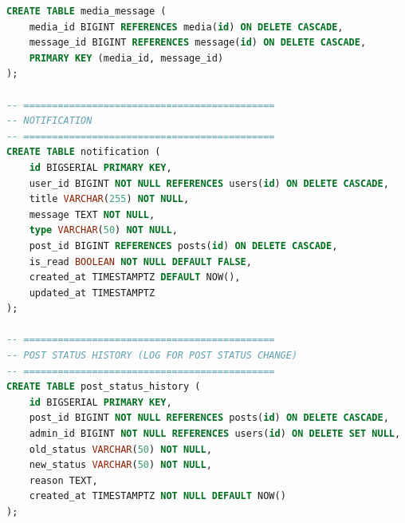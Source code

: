 \begin{lstlisting}[language=sql]
CREATE TABLE media_message (
    media_id BIGINT REFERENCES media(id) ON DELETE CASCADE,
    message_id BIGINT REFERENCES message(id) ON DELETE CASCADE,
    PRIMARY KEY (media_id, message_id)
);

-- ============================================
-- NOTIFICATION
-- ============================================
CREATE TABLE notification (
    id BIGSERIAL PRIMARY KEY,
    user_id BIGINT NOT NULL REFERENCES users(id) ON DELETE CASCADE,
    title VARCHAR(255) NOT NULL,
    message TEXT NOT NULL,
    type VARCHAR(50) NOT NULL,
    post_id BIGINT REFERENCES posts(id) ON DELETE CASCADE,
    is_read BOOLEAN NOT NULL DEFAULT FALSE,
    created_at TIMESTAMPTZ DEFAULT NOW(),
    updated_at TIMESTAMPTZ
);

-- ============================================
-- POST STATUS HISTORY (LOG FOR POST STATUS CHANGE)
-- ============================================
CREATE TABLE post_status_history (
    id BIGSERIAL PRIMARY KEY,
    post_id BIGINT NOT NULL REFERENCES posts(id) ON DELETE CASCADE,
    admin_id BIGINT NOT NULL REFERENCES users(id) ON DELETE SET NULL,
    old_status VARCHAR(50) NOT NULL,
    new_status VARCHAR(50) NOT NULL,
    reason TEXT,
    created_at TIMESTAMPTZ NOT NULL DEFAULT NOW()
);
\end{lstlisting}